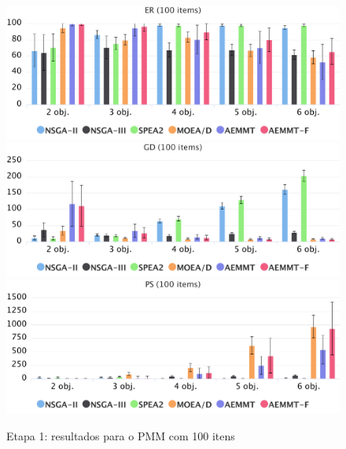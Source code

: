 \begin{figure}[!htbp]
	\caption{Etapa 1: resultados para o PMM com 100 itens}
	\label{fig_exp1_mkp_100}
	\includegraphics[width=1\textwidth]{cap_experimentos/figs/etapa1/er-mkp-100}
	\includegraphics[width=1\textwidth]{cap_experimentos/figs/etapa1/gd-mkp-100}
	\includegraphics[width=1\textwidth]{cap_experimentos/figs/etapa1/ps-mkp-100}
\end{figure}

